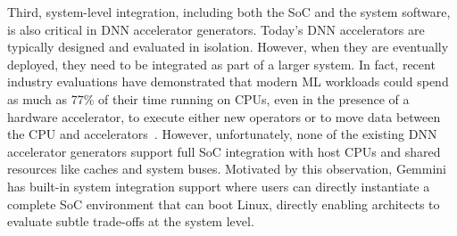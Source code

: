 Third, system-level integration, including both the SoC and the system software, is also critical in DNN accelerator generators.
Today's DNN accelerators are typically designed and evaluated in isolation. However, when they are eventually deployed, they need to be integrated as part of a larger system.
In fact, recent industry evaluations have demonstrated that modern ML
workloads could spend as much as 77\% of their time running on CPUs, even in the
presence of a hardware accelerator, to execute either new operators or to move
data between the CPU and accelerators~\cite{centaur-isca2020, edge-facebook,datacenter-facebook,ai-tax-hpca}.
However, unfortunately, none of the existing DNN accelerator generators support full SoC integration with host CPUs and shared resources like caches and system buses. Motivated by this observation, Gemmini has built-in system integration support where users can directly instantiate a complete SoC environment that can boot Linux, directly enabling architects to evaluate subtle trade-offs at the
system level.




